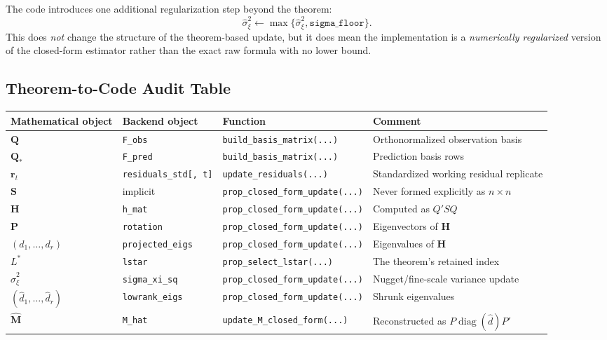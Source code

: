 \documentclass[11pt]{article}
\newcommand{\bQ}{\mathbf{Q}}
\newcommand{\bM}{\mathbf{M}}
\newcommand{\bS}{\mathbf{S}}
\newcommand{\bH}{\mathbf{H}}
\newcommand{\bP}{\mathbf{P}}
\newcommand{\br}{\mathbf{r}}
\newcommand{\diag}{\operatorname{diag}}
\begin{document}
The code introduces one additional regularization step beyond the theorem:
\[
\widehat{\sigma}_\xi^2 \leftarrow
\max\{\widehat{\sigma}_\xi^2, \texttt{sigma\_floor}\}.
\]
This does \emph{not} change the structure of the theorem-based update, but it
does mean the implementation is a \emph{numerically regularized} version of the
closed-form estimator rather than the exact raw formula with no lower bound.

\subsection{Theorem-to-Code Audit Table}

\begin{center}
\small
\begin{longtable}{p{} p{} p{} p{}}
\toprule
Mathematical object & Backend object & Function & Comment \\
\midrule
\endhead
\(\bQ\) & \texttt{F\_obs} & \texttt{build\_basis\_matrix(...)} & Orthonormalized observation basis \\
\(\bQ_*\) & \texttt{F\_pred} & \texttt{build\_basis\_matrix(...)} & Prediction basis rows \\
\(\br_t\) & \texttt{residuals\_std[, t]} & \texttt{update\_residuals(...)} & Standardized working residual replicate \\
\(\bS\) & implicit & \texttt{prop\_closed\_form\_update(...)} & Never formed explicitly as \(n\times n\) \\
\(\bH\) & \texttt{h\_mat} & \texttt{prop\_closed\_form\_update(...)} & Computed as \(Q'SQ\) \\
\(\bP\) & \texttt{rotation} & \texttt{prop\_closed\_form\_update(...)} & Eigenvectors of \(\bH\) \\
\((d_1,\ldots,d_r)\) & \texttt{projected\_eigs} & \texttt{prop\_closed\_form\_update(...)} & Eigenvalues of \(\bH\) \\
\(L^*\) & \texttt{lstar} & \texttt{prop\_select\_lstar(...)} & The theorem's retained index \\
\(\widehat{\sigma}_\xi^2\) & \texttt{sigma\_xi\_sq} & \texttt{prop\_closed\_form\_update(...)} & Nugget/fine-scale variance update \\
\((\widehat d_1,\ldots,\widehat d_r)\) & \texttt{lowrank\_eigs} & \texttt{prop\_closed\_form\_update(...)} & Shrunk eigenvalues \\
\(\widehat{\bM}\) & \texttt{M\_hat} & \texttt{update\_M\_closed\_form(...)} & Reconstructed as \(P \diag(\widehat d) P'\) \\
\bottomrule
\end{longtable}
\end{center}
\end{document}
